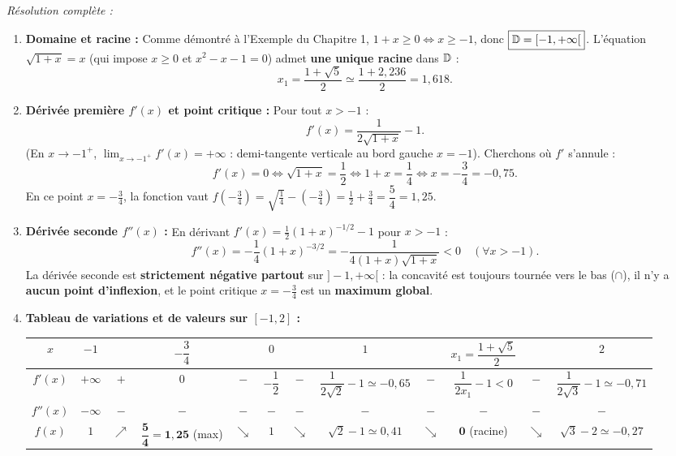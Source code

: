 \begin{exemple}
\emph{Résolution complète :}
\begin{enumerate}[label=\alph*)]
    \item \textbf{Domaine et racine :} Comme démontré à l'Exemple du Chapitre 1, $1 + x \ge 0 \iff x \ge -1$, donc $\boxed{\mathbb{D} = [-1, +\infty[}$. L'équation $\sqrt{1+x} = x$ (qui impose $x \ge 0$ et $x^2 - x - 1 = 0$) admet \textbf{une unique racine} dans $\mathbb{D}$ :
    \[
        \boxed{x_1 = \frac{1 + \sqrt{5}}{2} \simeq \frac{1 + 2,236}{2} = 1,618}.
    \]
    \item \textbf{Dérivée première $f'(x)$ et point critique :} Pour tout $x > -1$ :
    \[
        \boxed{f'(x) = \frac{1}{2\sqrt{1+x}} - 1}.
    \]
    (En $x \to -1^+$, $\lim_{x \to -1^+} f'(x) = +\infty$ : demi-tangente verticale au bord gauche $x = -1$). Cherchons où $f'$ s'annule :
    \[
        f'(x) = 0 \iff \sqrt{1+x} = \frac{1}{2} \iff 1 + x = \frac{1}{4} \iff \boxed{x = -\frac{3}{4} = -0,75}.
    \]
    En ce point $x = -\frac{3}{4}$, la fonction vaut $f\left(-\frac{3}{4}\right) = \sqrt{\frac{1}{4}} - \left(-\frac{3}{4}\right) = \frac{1}{2} + \frac{3}{4} = \dfrac{5}{4} = 1,25$.
    \item \textbf{Dérivée seconde $f''(x)$ :} En dérivant $f'(x) = \frac{1}{2}(1+x)^{-1/2} - 1$ pour $x > -1$ :
    \[
        \boxed{f''(x) = -\frac{1}{4}(1+x)^{-3/2} = -\frac{1}{4(1+x)\sqrt{1+x}} < 0 \quad (\forall x > -1)}.
    \]
    La dérivée seconde est \textbf{strictement négative partout} sur $]-1, +\infty[$ : la concavité est toujours tournée vers le bas ($\cap$), il n'y a \textbf{aucun point d'inflexion}, et le point critique $x = -\frac{3}{4}$ est un \textbf{maximum global}.
    \item \textbf{Tableau de variations et de valeurs sur $[-1, 2]$ :}
    \begin{center}
    {\scriptsize
    \renewcommand{\arraystretch}{1.45}
    \setlength{\tabcolsep}{1.4pt}
    \begin{tabular}{|c||c|c|c|c|c|c|c|c|c|c|c|}
    \hline
    $x$ & $-1$ & & $-\dfrac{3}{4}$ & & $0$ & & $1$ & & $x_1 = \dfrac{1+\sqrt{5}}{2}$ & & $2$ \\ \hline\hline
    $f'(x)$ & $+\infty$ & $+$ & $0$ & $-$ & $-\dfrac{1}{2}$ & $-$ & $\dfrac{1}{2\sqrt{2}}-1 \simeq -0,65$ & $-$ & $\dfrac{1}{2x_1}-1 < 0$ & $-$ & $\dfrac{1}{2\sqrt{3}}-1 \simeq -0,71$ \\ \hline
    $f''(x)$ & $-\infty$ & $-$ & $-$ & $-$ & $-$ & $-$ & $-$ & $-$ & $-$ & $-$ & $-$ \\ \hline
    $f(x)$ & $1$ & $\nearrow$ & $\mathbf{\dfrac{5}{4} = 1,25}$ (max) & $\searrow$ & $1$ & $\searrow$ & $\sqrt{2}-1 \simeq 0,41$ & $\searrow$ & $\mathbf{0}$ (racine) & $\searrow$ & $\sqrt{3}-2 \simeq -0,27$ \\ \hline

\end{tabular}}
\end{center}
\end{enumerate}
\end{exemple}
